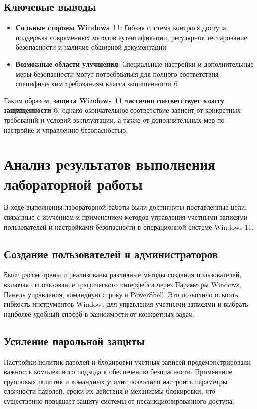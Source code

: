 \documentclass[a4paper, 14pt]{report}
\begin{document}
\subsection{Ключевые выводы}

\begin{itemize}
    \item \textbf{Сильные стороны Windows 11}: Гибкая система контроля доступа, поддержка современных методов аутентификации, регулярное тестирование безопасности и наличие обширной документации
    \item \textbf{Возможные области улучшения}: Специальные настройки и дополнительные меры безопасности могут потребоваться для полного соответствия специфическим требованиям класса защищенности 6
\end{itemize}

Таким образом, \textbf{защита Windows 11 частично соответствует классу защищенности 6}, однако окончательное соответствие зависит от конкретных требований и условий эксплуатации, а также от дополнительных мер по настройке и управлению безопасностью.
\section{Анализ результатов выполнения лабораторной работы}

В ходе выполнения лабораторной работы были достигнуты поставленные цели, связанные с изучением и применением методов управления учетными записями пользователей и настройками безопасности в операционной системе Windows 11. 

\subsection{Создание пользователей и администраторов}
Были рассмотрены и реализованы различные методы создания пользователей, включая использование графического интерфейса через Параметры Windows, Панель управления, командную строку и PowerShell. Это позволило освоить гибкость инструментов Windows для управления учетными записями и выбрать наиболее удобный способ в зависимости от конкретных задач.

\subsection{Усиление парольной защиты}
Настройки политик паролей и блокировки учетных записей продемонстрировали важность комплексного подхода к обеспечению безопасности. Применение групповых политик и командных утилит позволило настроить параметры сложности паролей, сроки их действия и механизмы блокировки, что существенно повышает защиту системы от несанкционированного доступа.
\end{document}
